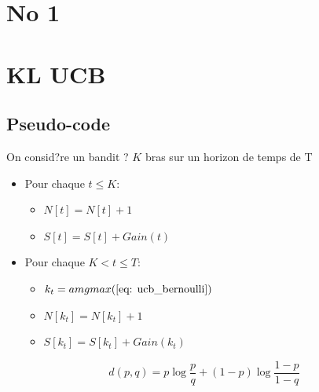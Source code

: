 \documentclass[letterpaper,11pt]{article}
\begin{document}
\pagestyle{fancy}


%

\section{No 1}

\section{KL UCB}


\subsection{Pseudo-code}
On consid?re un bandit ? $K$ bras sur un horizon de temps de T
\begin{itemize}
\setlength\itemsep{0.2cm}

\item Pour chaque $t\leq K:$

\begin{itemize}

\item $N[t] = N[t]+1$

\item $S[t] = S[t]+Gain(t)$

\end{itemize}

\item Pour chaque $K < t \leq T:$

\begin{itemize}

\item $k_t = amgmax(\ref{eq: ucb_bernoulli})$

\item $N[k_t] = N[k_t]+1$

\item $S[k_t] = S[k_t]+Gain(k_t)$

\end{itemize}


\end{itemize}

\begin{equation}
d(p,q) = p \log \frac{p}{q} + (1-p) \log \frac{1-p}{1-q}
\end{equation}\label{eq: differentien_bernoulli}
\end{document}
